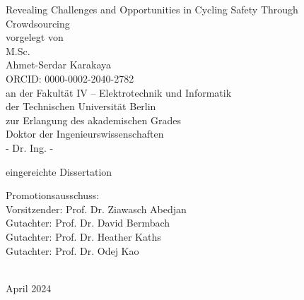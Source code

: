 
\thispagestyle{empty}
\begin{center}
    \huge{Revealing Challenges and Opportunities in Cycling Safety Through Crowdsourcing}\\[2pc]
    
    \large{vorgelegt von}\\
    \large{M.Sc.}\\
    \large{Ahmet-Serdar Karakaya}\\
    \large{ORCID: 0000-0002-2040-2782}\\[2pc]


    an der Fakultät IV – Elektrotechnik und Informatik\\
    der Technischen Universität Berlin\\
    zur Erlangung des akademischen Grades\\
    Doktor der Ingenieurswissenschaften\\
    - Dr. Ing. -
\end{center}

\begin{center}
eingereichte Dissertation
\end{center}

Promotionsausschuss:\\
Vorsitzender: Prof. Dr. Ziawasch Abedjan\\
Gutachter: Prof. Dr. David Bermbach\\
Gutachter: Prof. Dr. Heather Kaths\\
Gutachter: Prof. Dr. Odej Kao\\
\\
\begin{center}
April 2024
\end{center}

\afterpage{\null\thispagestyle{empty}\newpage}

